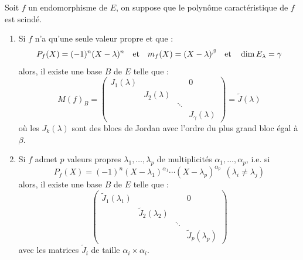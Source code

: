 \documentclass{article}
\begin{document}
\begin{thm}[de Jordan]
Soit $f$ un endomorphisme de $E$, on suppose que le polynôme caractéristique de $f$ est scindé.

\begin{enumerate}

\item
Si $f$ n'a qu'une seule valeur propre et que :
\[ P_f(X) = (-1)^n(X-\lambda)^n \quad \text{et} \quad m_f(X) = (X-\lambda)^{\beta} \quad \text{et} \quad \dim{E_{\lambda}} = \gamma \]
alors, il existe une base $B$ de $E$ telle que :
\[ M(f)_{B} =
\begin{pmatrix}
J_1(\lambda) & & & 0 \\
 & J_2(\lambda) & & \\
 & & \ddots & \\
 & & & J_{\gamma}(\lambda)
\end{pmatrix} = \tilde{J}(\lambda) \] 
où les $J_k(\lambda)$ sont des blocs de Jordan avec l'ordre du plus grand bloc égal à $\beta$.

\item
Si $f$ admet $p$ valeurs propres $\lambda_1, \dots, \lambda_p$ de multiplicités $\alpha_1,\dots, \alpha_p$, i.e. si
\[ P_f(X) = (-1)^n(X-\lambda_1)^{\alpha_1} \cdots (X-\lambda_p)^{\alpha_p} ~~ (\lambda_i \neq \lambda_j) \]
alors, il existe une base $B$ de $E$ telle que :
\[ \begin{pmatrix}
\tilde{J}_1(\lambda_1) & & & 0 \\
 & \tilde{J}_2(\lambda_2) & & \\
 & & \ddots & \\
 & & & \tilde{J}_p(\lambda_p)
\end{pmatrix} \]
avec les matrices $\tilde{J}_i$ de taille $\alpha_i \times \alpha_i$.
\end{enumerate}
\end{thm}
\end{document}
